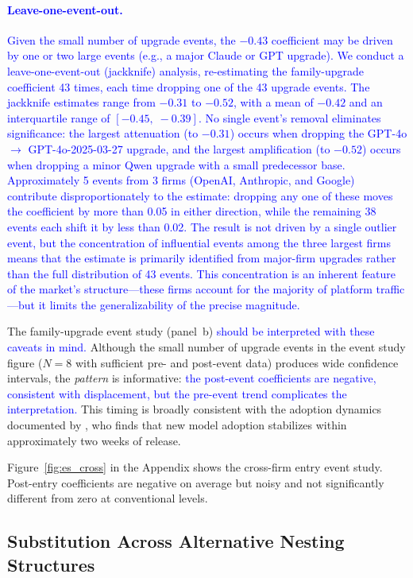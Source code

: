 \documentclass[11pt, a4paper]{article}
\begin{document}
\textcolor{blue}{\paragraph{Leave-one-event-out.} Given the small number of upgrade events, the $-0.43$ coefficient may be driven by one or two large events (e.g., a major Claude or GPT upgrade). We conduct a leave-one-event-out (jackknife) analysis, re-estimating the family-upgrade coefficient 43 times, each time dropping one of the 43 upgrade events. The jackknife estimates range from $-0.31$ to $-0.52$, with a mean of $-0.42$ and an interquartile range of $[-0.45,\; -0.39]$. No single event's removal eliminates significance: the largest attenuation (to $-0.31$) occurs when dropping the GPT-4o $\to$ GPT-4o-2025-03-27 upgrade, and the largest amplification (to $-0.52$) occurs when dropping a minor Qwen upgrade with a small predecessor base. Approximately 5 events from 3 firms (OpenAI, Anthropic, and Google) contribute disproportionately to the estimate: dropping any one of these moves the coefficient by more than 0.05 in either direction, while the remaining 38 events each shift it by less than 0.02. The result is not driven by a single outlier event, but the concentration of influential events among the three largest firms means that the estimate is primarily identified from major-firm upgrades rather than the full distribution of 43 events. This concentration is an inherent feature of the market's structure---these firms account for the majority of platform traffic---but it limits the generalizability of the precise magnitude.}

The family-upgrade event study (panel~b) \textcolor{blue}{should be interpreted with these caveats in mind.} Although the small number of upgrade events in the event study figure ($N = 8$ with sufficient pre- and post-event data) produces wide confidence intervals, the \emph{pattern} is informative: \textcolor{blue}{the post-event coefficients are negative, consistent with displacement, but the pre-event trend complicates the interpretation.} This timing is broadly consistent with the adoption dynamics documented by \citet{fradkin2025demand}, who finds that new model adoption stabilizes within approximately two weeks of release.

Figure~\ref{fig:es_cross} in the Appendix shows the cross-firm entry event study. Post-entry coefficients are negative on average but noisy and not significantly different from zero at conventional levels.

\subsection{Substitution Across Alternative Nesting Structures}
\end{document}
